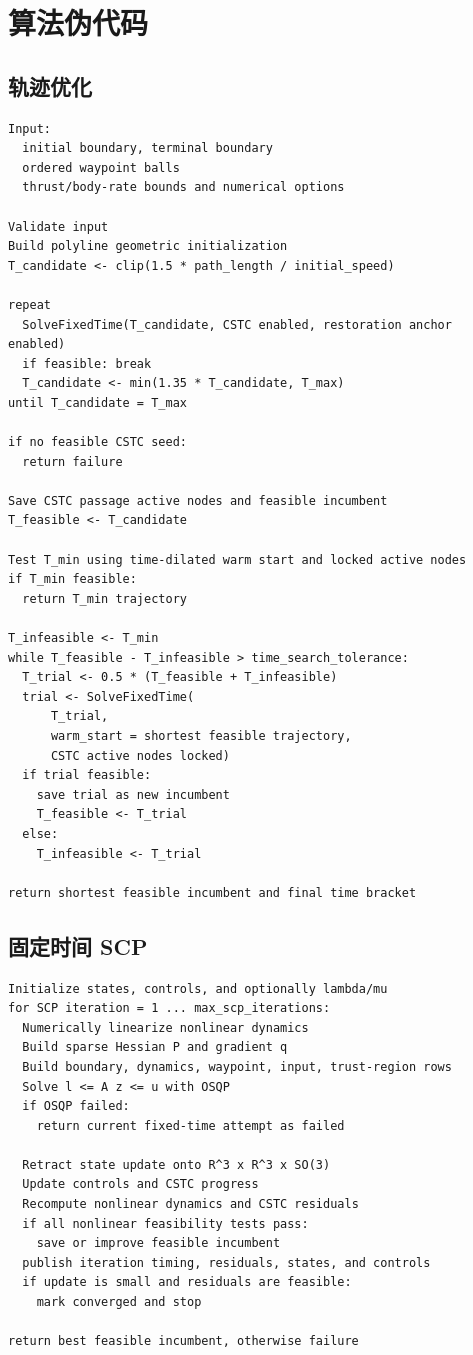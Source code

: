 \documentclass[UTF8,a4paper,11pt]{ctexart}
\begin{document}
\section{算法伪代码}

\subsection{轨迹优化}

\begin{lstlisting}
Input:
  initial boundary, terminal boundary
  ordered waypoint balls
  thrust/body-rate bounds and numerical options

Validate input
Build polyline geometric initialization
T_candidate <- clip(1.5 * path_length / initial_speed)

repeat
  SolveFixedTime(T_candidate, CSTC enabled, restoration anchor enabled)
  if feasible: break
  T_candidate <- min(1.35 * T_candidate, T_max)
until T_candidate = T_max

if no feasible CSTC seed:
  return failure

Save CSTC passage active nodes and feasible incumbent
T_feasible <- T_candidate

Test T_min using time-dilated warm start and locked active nodes
if T_min feasible:
  return T_min trajectory

T_infeasible <- T_min
while T_feasible - T_infeasible > time_search_tolerance:
  T_trial <- 0.5 * (T_feasible + T_infeasible)
  trial <- SolveFixedTime(
      T_trial,
      warm_start = shortest feasible trajectory,
      CSTC active nodes locked)
  if trial feasible:
    save trial as new incumbent
    T_feasible <- T_trial
  else:
    T_infeasible <- T_trial

return shortest feasible incumbent and final time bracket
\end{lstlisting}

\subsection{固定时间 SCP}

\begin{lstlisting}
Initialize states, controls, and optionally lambda/mu
for SCP iteration = 1 ... max_scp_iterations:
  Numerically linearize nonlinear dynamics
  Build sparse Hessian P and gradient q
  Build boundary, dynamics, waypoint, input, trust-region rows
  Solve l <= A z <= u with OSQP
  if OSQP failed:
    return current fixed-time attempt as failed

  Retract state update onto R^3 x R^3 x SO(3)
  Update controls and CSTC progress
  Recompute nonlinear dynamics and CSTC residuals
  if all nonlinear feasibility tests pass:
    save or improve feasible incumbent
  publish iteration timing, residuals, states, and controls
  if update is small and residuals are feasible:
    mark converged and stop

return best feasible incumbent, otherwise failure
\end{lstlisting}
\end{document}
